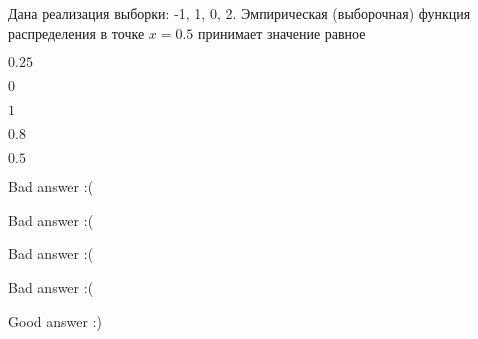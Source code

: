 
\begin{question}
Дана реализация выборки: -1, 1, 0, 2. Эмпирическая (выборочная) функция
распределения в точке \(x=0.5\) принимает значение равное
\begin{answerlist}
  \item \(0.25\)
  \item \(0\)
  \item \(1\)
  \item \(0.8\)
  \item \(0.5\)
\end{answerlist}
\end{question}

\begin{solution}
\begin{answerlist}
  \item Bad answer :(
  \item Bad answer :(
  \item Bad answer :(
  \item Bad answer :(
  \item Good answer :)
\end{answerlist}
\end{solution}

